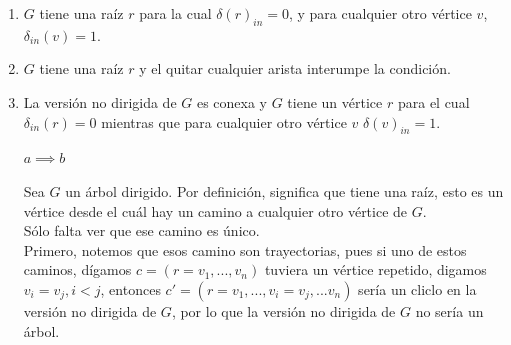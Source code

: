 \documentclass[12pt,a4paper]{report}
\begin{document}
\begin{enumerate}
{\begin{enumerate} [label = \alph*)]
				\item{
					$G$ tiene una raíz $r$ para la cual $\delta(r)_{in} = 0$, y para cualquier
					otro vértice $v$, $\delta_{in}(v) = 1$.\\
				}

				\item{
					$G$ tiene una raíz $r$ y el quitar cualquier arista interumpe la
					condición.\\
				}
				\item{
					La versión no dirigida de $G$ es conexa y $G$ tiene un vértice $r$ para
					el cual $\delta_{in}(r) = 0$ mientras que para cualquier otro vértice
					$v$ $\delta(v)_{in} = 1$.\\
				}
			\end{enumerate}

			\begin{itemize}
				\item[$a \implies b$]{

					Sea $G$ un árbol dirigido. Por definición, significa que tiene una raíz,
					esto es un vértice desde el cuál hay un camino a cualquier otro vértice de
					$G$.\\
					Sólo falta ver que ese camino es único.\\

					Primero, notemos que esos camino son trayectorias, pues si uno de estos
					caminos, dígamos $c = (r = v_1, ..., v_n)$ tuviera un vértice repetido,
					digamos $v_i = v_j, i < j$, entonces $c' = (r = v_1, ..., v_i = v_j, ... v_n)$
					sería un cliclo en la versión no dirigida de $G$, por lo que la versión
					no dirigida de $G$ no sería un árbol.\\

}
\end{itemize}}
\end{enumerate}
\end{document}
